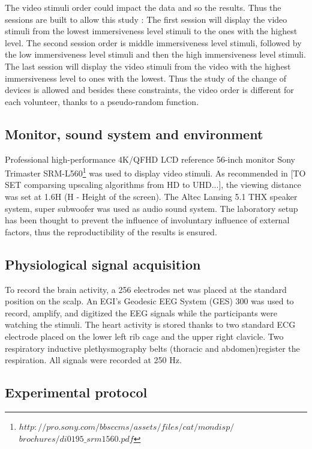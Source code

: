 The video stimuli order could impact the data and so the results. Thus the sessions are built to allow this study : The first session will display the video stimuli from the lowest immersiveness level stimuli to the ones with the highest level. The second session order is middle immersiveness level stimuli, followed by the low immersiveness level stimuli and then the high immersiveness level stimuli. The last session will display the video stimuli from the video with the highest immersiveness level to ones with the lowest.
Thus the study of the change of devices is allowed and besides these constraints, the video order is different for each volunteer, thanks to a pseudo-random function. 

\subsection{Monitor, sound system and environment}

Professional high-performance 4K/QFHD LCD reference 56-inch monitor Sony Trimaster SRM-L560\footnote{$http://pro.sony.com/bbsccms/assets/files/cat/mondisp/$ \newline $brochures/di0195\_srm1560.pdf$} was used to display video stimuli.
As recommended in [TO SET comparsing upscaling algorithms from HD to UHD...], the viewing distance was set at 1.6H (H - Height of the screen).
The Altec Lansing 5.1 THX speaker system, super subwoofer was used as audio sound system.
The laboratory setup has been thought to prevent the influence of involuntary influence of external factors, thus the reproductibility of the results is ensured.

\subsection{Physiological signal acquisition}

To record the brain activity, a 256 electrodes net was placed at the standard position on the scalp. An EGI's Geodesic EEG System (GES) 300 was used to record, amplify, and digitized the EEG signals while the participants were watching the stimuli. The heart activity is stored thanks to two standard \ac{ECG} electrode placed on the lower left rib cage and the upper right clavicle. Two respiratory inductive plethysmography belts (thoracic and abdomen)register the respiration. All signals were recorded at 250 Hz.

\subsection{Experimental protocol}

